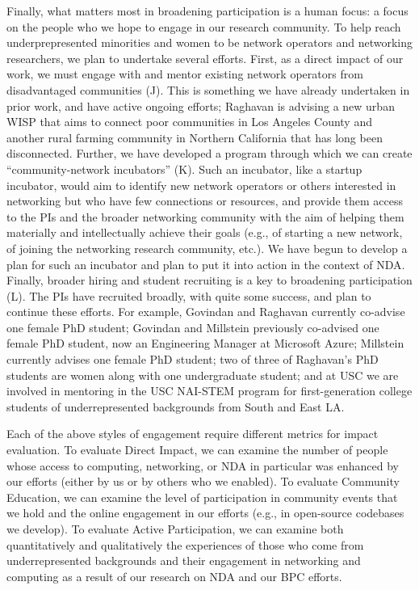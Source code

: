 \documentclass[10pt]{article}
\begin{document}
Finally, what matters most in broadening participation is a human focus: a focus on the people who we hope to engage in our research community.  To help reach underprepresented minorities and women to be network operators and networking researchers, we plan to undertake several efforts.  First, as a direct impact of our work, we must engage with and mentor existing network operators from disadvantaged communities (J).  This is something we have already undertaken in prior work, and have active ongoing efforts; Raghavan is advising a new urban WISP that aims to connect poor communities in Los Angeles County and another rural farming community in Northern California that has long been disconnected.  Further, we have developed a program through which we can create ``community-network incubators'' (K).  Such an incubator, like a startup incubator, would aim to identify new network operators or others interested in networking but who have few connections or resources, and provide them access to the PIs and the broader networking community with the aim of helping them materially and intellectually achieve their goals (e.g., of starting a new network, of joining the networking research community, etc.).  We have begun to develop a plan for such an incubator and plan to put it into action in the context of NDA.
Finally, broader hiring and student recruiting is a key to broadening participation (L).  The PIs have recruited broadly, with quite some success, and plan to continue these efforts. For example, Govindan and Raghavan currently co-advise one female PhD student; Govindan and Millstein previously co-advised one female PhD student, now an Engineering Manager at Microsoft Azure; Millstein currently advises one female PhD student; two of three of Raghavan's PhD students are women along with one undergraduate student; and at USC we are involved in mentoring in the USC NAI-STEM program for first-generation college students of underrepresented backgrounds from South and East LA.

Each of the above styles of engagement require different metrics for impact evaluation.  To evaluate Direct Impact, we can examine the number of people whose access to computing, networking, or NDA in particular was enhanced by our efforts (either by us or by others who we enabled).  To evaluate Community Education, we can examine the level of participation in community events that we hold and the online engagement in our efforts (e.g., in open-source codebases we develop).  To evaluate Active Participation, we can examine both quantitatively and qualitatively the experiences of those who come from underrepresented backgrounds and their engagement in networking and computing as a result of our research on NDA and our BPC efforts.
\end{document}

